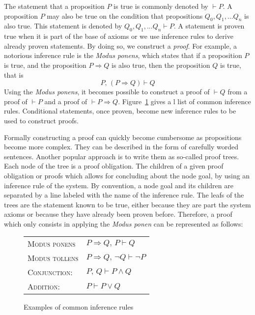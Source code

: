 \documentclass[oneside,a4paper]{memoir}
\theoremstyle{break}
\begin{document}
The statement that a proposition \( P \) is true is commonly denoted by
\( \vdash P \).
%
A proposition \( P \) may also be true on the condition that propositions
\( Q_0, Q_1, ... Q_n \) is also true.
%
This statement is denoted by \( Q_0, Q_1, ... Q_n \vdash P \).
%
A statement is proven true when it is part of the base of axioms or we use
inference rules to derive already proven statements.
%
By doing so, we construct a \emph{proof}.
%
For example, a notorious inference rule is the \emph{Modus ponens}, which states
that if a proposition \( P \) is true, and the proposition \( P \Rightarrow Q \)
is also true, then the proposition \( Q \) is true, that is
%
\[
  P\text{, }(P \Rightarrow Q) \vdash Q
\]
%
Using the \emph{Modus ponens}, it becomes possible to construct a proof of
\( \vdash Q \) from a proof of \( \vdash P \) and a proof of
\( \vdash P \Rightarrow Q \).
%
Figure~\ref{fig:sota:inference} gives a l list of common inference rules.
%
Conditional statements, once proven, become new inference rules to be used to
construct proofs.

Formally constructing a proof can quickly become cumbersome as propositions
become more complex.
%
They can be described in the form of carefully worded sentences.
%
Another popular approach is to write them as so-called proof trees.
%
Each node of the tree is a proof obligation.
%
The children of a given proof obligation or proofs which allows for concluding
about the node goal, by using an inference rule of the system.
%
By convention, a node goal and its children are separated by a line labeled with
the name of the inference rule.
%
The leafs of the trees are the statement known to be true, either because they
are part the system axioms or because they have already been proven before.
%
Therefore, a proof which only consists in applying the \emph{Modus ponen} can be
represented as follows:
%
\begin{prooftree}
     
\end{prooftree}

\begin{figure}
  \begin{center}
    \begin{tabular}{ll}
      {\scshape Modus ponens} & \( P \Rightarrow Q\text{, }P \vdash Q \) \\
      {\scshape Modus tollens} &
                                 \( P \Rightarrow Q\text{, }\neg Q \vdash \neg P \) \\
      {\scshape Conjunction:} & \( P\text{, }Q \vdash P \wedge Q \) \\
      {\scshape Addition:} & \( P \vdash P \vee Q \)
    \end{tabular}
  \end{center}

  \caption{Examples of common inference rules}
  \label{fig:sota:inference}
\end{figure}
\end{document}
